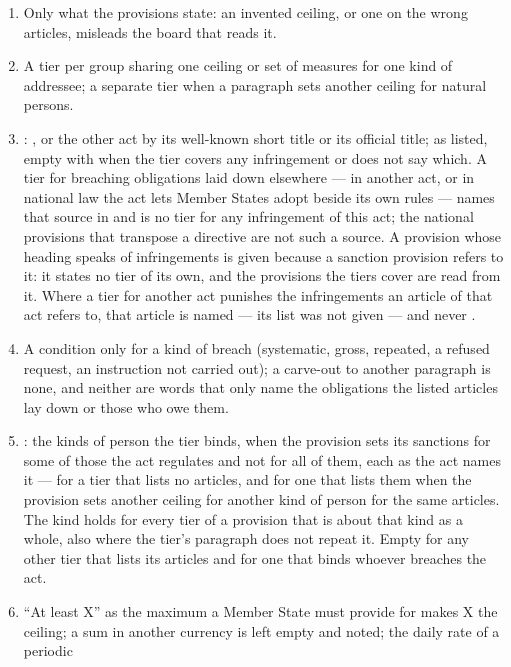 \begin{enumerate}[itemsep=1pt, topsep=3pt]
  \item Only what the provisions state: an invented ceiling, or one on the wrong articles,
    misleads the board that reads it.
  \item A tier per group sharing one ceiling or set of measures for one kind of addressee; a
    separate tier when a paragraph sets another ceiling for natural persons.
  \item {}: , or the other act by its well-known short title or its
    official title;  as listed, empty with  when the tier covers any
    infringement or does not say which. A tier for breaching obligations laid down elsewhere
    --- in another act, or in national law the act lets Member States adopt beside its own
    rules --- names that source in  and is no tier for any infringement of
    this act; the national provisions that transpose a directive are not such a source. A
    provision whose heading speaks of infringements is given because a sanction provision
    refers to it: it states no tier of its own, and the provisions the tiers cover are read
    from it. Where a tier for another act punishes the infringements an article of that act
    refers to, that article is named --- its list was not given --- and never .
  \item A condition only for a kind of breach (systematic, gross, repeated, a refused request,
    an instruction not carried out); a carve-out to another paragraph is none, and neither
    are words that only name the obligations the listed articles lay down or those who owe
    them.
  \item {}: the kinds of person the tier binds, when the provision sets its
    sanctions for some of those the act regulates and not for all of them, each as the act
    names it --- for a tier that lists no articles, and for one that lists them when the
    provision sets another ceiling for another kind of person for the same articles. The
    kind holds for every tier of a provision that is about that kind as a whole, also where
    the tier's paragraph does not repeat it. Empty for any other tier that lists its
    articles and for one that binds whoever breaches the act.
  \item \enquote{At least X} as the maximum a Member State must provide for makes X the
    ceiling; a sum in another currency is left empty and noted; the daily rate of a periodic

\end{enumerate}
